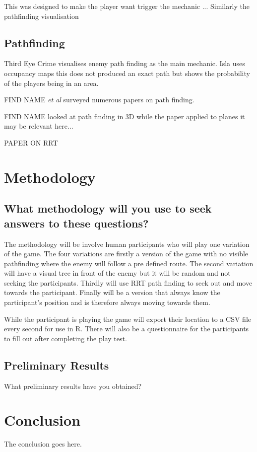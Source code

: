 \documentclass[journal]{IEEEtran}
\begin{document}
 This was designed to make the player want trigger the mechanic ...  Similarly the pathfinding visualisation  


\subsection{Pathfinding}
Third Eye Crime \cite{Isla2014} visualises enemy path finding as the main mechanic. Isla uses occupancy maps this does not produced an exact path but shows the probability of the players being in an area. 

FIND NAME \textit{et al} surveyed numerous papers on path finding. 

FIND NAME looked at path finding in 3D while the paper applied to planes it may be relevant here...

PAPER ON RRT



\section{Methodology}
\subsection{What methodology will you use to seek answers to these questions?}
The methodology will be involve human participants who will play one variation of the game. The four variations are firstly a version of the game with no visible pathfinding where the enemy will follow a pre defined route. The second variation will have a visual tree in front of the enemy but it will be random and not seeking the participants. Thirdly will use RRT path finding to seek out and move towards the participant. Finally will be a version that always know the participant's position and is therefore always moving towards them.

While the participant is playing the game will export their location to a CSV file every second for use in R. There will also be a questionnaire for the participants to fill out after completing the play test.


\subsection{Preliminary Results}
What preliminary results have you obtained?


\section{Conclusion}
The conclusion goes here.







\end{document}
